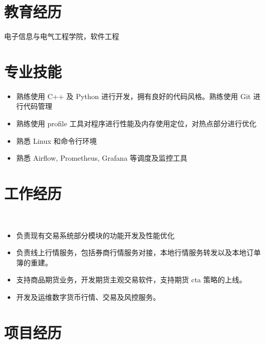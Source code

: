\documentclass{resume}
\begin{document}



\section{教育经历}
\textit{} 电子信息与电气工程学院，软件工程

\section{专业技能}
\begin{itemize}
\item 熟练使用 C++ 及 Python 进行开发，拥有良好的代码风格。熟练使用 Git 进行代码管理
\item 熟练使用 profile 工具对程序进行性能及内存使用定位，对热点部分进行优化
\item 熟悉 Linux 和命令行环境
\item 熟悉 Airflow, Prometheus, Grafana 等调度及监控工具
\end{itemize}

\section{工作经历}

\
\begin{itemize}
\item 负责现有交易系统部分模块的功能开发及性能优化

\item 负责线上行情服务，包括券商行情服务对接，本地行情服务转发以及本地订单簿的重建。

\item 支持商品期货业务，开发期货主观交易软件，支持期货 cta 策略的上线。

\item 开发及运维数字货币行情、交易及风控服务。

\end{itemize}


\section{项目经历}
\end{document}
